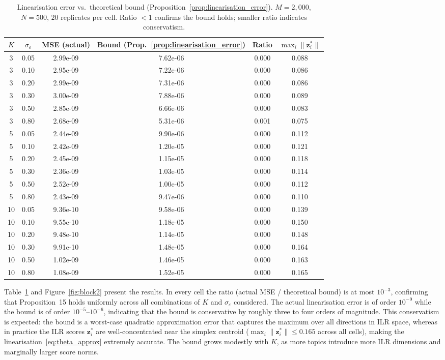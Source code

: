\begin{table}[t]
\centering
\caption{Linearisation error vs.\ theoretical bound (Proposition~\ref{prop:linearisation_error}). $M=2,000$, $N=500$, $20$ replicates per cell. Ratio $< 1$ confirms the bound holds; smaller ratio indicates conservatism.}
\label{tab:block2}
\begin{tabular}{cccccc}
\toprule
$K$ & $\sigma_\varepsilon$ & MSE (actual) & Bound (Prop.~\ref{prop:linearisation_error}) & Ratio & $\max_i\|\mathbf{z}_i^*\|$ \\
\midrule
3 & 0.05 & 2.99e-09 & 7.62e-06 & 0.000 & 0.088 \\
3 & 0.10 & 2.95e-09 & 7.22e-06 & 0.000 & 0.086 \\
3 & 0.20 & 2.99e-09 & 7.31e-06 & 0.000 & 0.086 \\
3 & 0.30 & 3.00e-09 & 7.88e-06 & 0.000 & 0.089 \\
3 & 0.50 & 2.85e-09 & 6.66e-06 & 0.000 & 0.083 \\
3 & 0.80 & 2.68e-09 & 5.31e-06 & 0.001 & 0.075 \\
5 & 0.05 & 2.44e-09 & 9.90e-06 & 0.000 & 0.112 \\
5 & 0.10 & 2.42e-09 & 1.20e-05 & 0.000 & 0.121 \\
5 & 0.20 & 2.45e-09 & 1.15e-05 & 0.000 & 0.118 \\
5 & 0.30 & 2.36e-09 & 1.03e-05 & 0.000 & 0.114 \\
5 & 0.50 & 2.52e-09 & 1.00e-05 & 0.000 & 0.112 \\
5 & 0.80 & 2.43e-09 & 9.47e-06 & 0.000 & 0.110 \\
10 & 0.05 & 9.36e-10 & 9.58e-06 & 0.000 & 0.139 \\
10 & 0.10 & 9.55e-10 & 1.18e-05 & 0.000 & 0.150 \\
10 & 0.20 & 9.48e-10 & 1.14e-05 & 0.000 & 0.148 \\
10 & 0.30 & 9.91e-10 & 1.48e-05 & 0.000 & 0.164 \\
10 & 0.50 & 1.02e-09 & 1.46e-05 & 0.000 & 0.163 \\
10 & 0.80 & 1.08e-09 & 1.52e-05 & 0.000 & 0.165 \\
\bottomrule
\end{tabular}
\end{table}

Table~\ref{tab:block2} and Figure~\ref{fig:block2} present the results.
In every cell the ratio (actual MSE / theoretical bound) is at most
$10^{-3}$, confirming that Proposition~15 holds uniformly across all
combinations of $K$ and $\sigma_\varepsilon$ considered.
The actual linearisation error is of order $10^{-9}$ while the bound
is of order $10^{-5}$--$10^{-6}$, indicating that the bound is
conservative by roughly three to four orders of magnitude.
This conservatism is expected: the bound is a worst-case quadratic
approximation error that captures the maximum over all directions in
ILR space, whereas in practice the ILR scores $\mathbf{z}_i^*$ are
well-concentrated near the simplex centroid
($\max_i\|\mathbf{z}_i^*\|\leq 0.165$ across all cells), making the
linearisation~\eqref{eq:theta_approx} extremely accurate.
The bound grows modestly with $K$, as more topics introduce more
ILR dimensions and marginally larger score norms.

